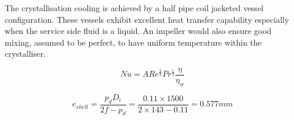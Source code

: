 The crystallisation cooling is achieved by a half pipe coil jacketed vessel configuration. These vessels exhibit excellent heat transfer capability especially when the service side fluid is a liquid. An impeller would also ensure good mixing, assumed to be perfect, to have uniform temperature within the crystalliser.

\begin{equation}
    Nu = ARe^{\frac{2}{3}}Pr^{\frac{1}{3}}\frac{\eta}{\eta_w}
\end{equation}

\begin{equation}
    e_{shell} = \frac{p_dD_i}{2f-p_d} = \frac{0.11 \times 1500}{2 \times 143 - 0.11} = 0.577mm
    \label{eqn:minthicknessshell}
\end{equation}

